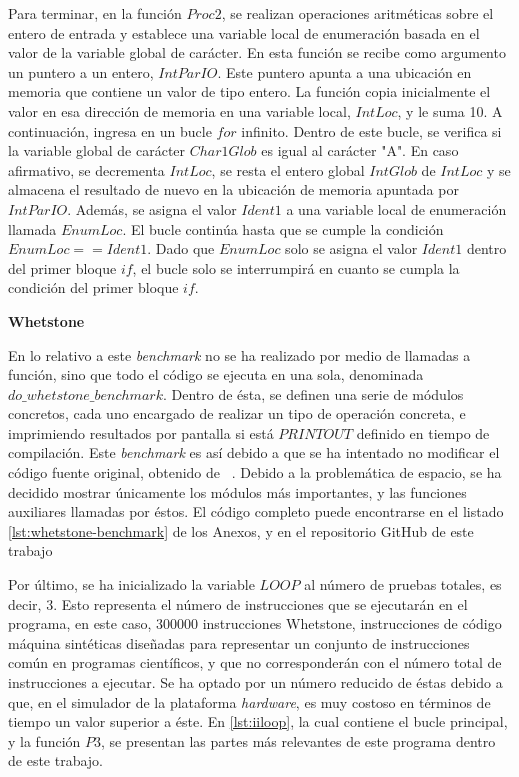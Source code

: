 Para terminar, en la función $Proc2$, se realizan operaciones aritméticas sobre el entero de entrada y establece una variable local de enumeración basada en el valor de la variable global de carácter. En esta función se recibe como argumento un puntero a un entero, $IntParIO$. Este puntero apunta a una ubicación en memoria que contiene un valor de tipo entero. La función copia inicialmente el valor en esa dirección de memoria en una variable local, $IntLoc$, y le suma 10. A continuación, ingresa en un bucle $for$ infinito. Dentro de este bucle, se verifica si la variable global de carácter $Char1Glob$ es igual al carácter "A". En caso afirmativo, se decrementa $IntLoc$, se resta el entero global $IntGlob$ de $IntLoc$ y se almacena el resultado de nuevo en la ubicación de memoria apuntada por $IntParIO$. Además, se asigna el valor $Ident1$ a una variable local de enumeración llamada $EnumLoc$. El bucle continúa hasta que se cumple la condición $EnumLoc == Ident1$. Dado que $EnumLoc$ solo se asigna el valor $Ident1$ dentro del primer bloque $if$, el bucle solo se interrumpirá en cuanto se cumpla la condición del primer bloque $if$. \newline

\par{\textbf{Whetstone}}

\par{En lo relativo a este \textit{benchmark} no se ha realizado por medio de llamadas a función, sino que todo el código se ejecuta en una sola, denominada $do\_whetstone\_benchmark$. Dentro de ésta, se definen una serie de módulos concretos, cada uno encargado de realizar un tipo de operación concreta, e imprimiendo resultados por pantalla si está $PRINTOUT$ definido en tiempo de compilación. Este \textit{benchmark} es así debido a que se ha intentado no modificar el código fuente original, obtenido de ~\cite{whetstone-code}. Debido a la problemática de espacio, se ha decidido mostrar únicamente los módulos más importantes, y las funciones auxiliares llamadas por éstos. El código completo puede encontrarse en el listado \ref{lst:whetstone-benchmark} de los Anexos, y en el repositorio GitHub de este trabajo \cite{repoTFM-whetstone}} 

\par{Por último, se ha inicializado la variable $LOOP$ al número de pruebas totales, es decir, 3. Esto representa el número de instrucciones que se ejecutarán en el programa, en este caso, 300000 instrucciones Whetstone, instrucciones de código máquina sintéticas diseñadas para representar un conjunto de instrucciones común en programas científicos, y que no corresponderán con el número total de instrucciones a ejecutar. Se ha optado por un número reducido de éstas debido a que, en el simulador de la plataforma \textit{hardware}, es muy costoso en términos de tiempo un valor superior a éste. En \ref{lst:iiloop}, la cual contiene el bucle principal, y la función $P3$, se presentan las partes más relevantes de este programa dentro de este trabajo.}

